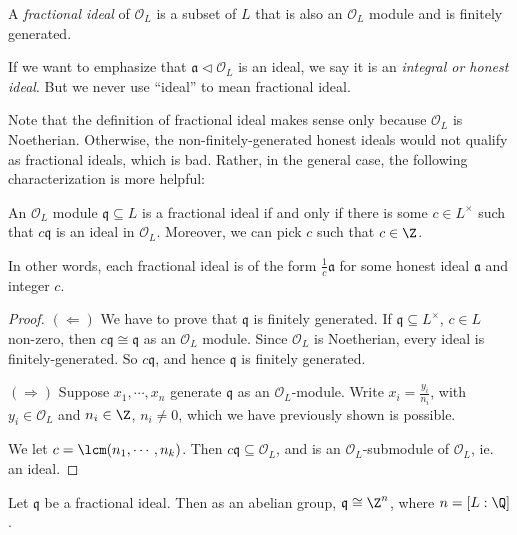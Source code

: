 \documentclass[a4paper]{article}
\begin{document}
\begin{defi}
  A \emph{fractional ideal} of $\mathcal{O}_L$ is a subset of $L$ that is also an $\mathcal{O}_L$ module and is finitely generated.
\end{defi}

\begin{defi}
  If we want to emphasize that $\mathfrak{a} \lhd \mathcal{O}_L$ is an ideal, we say it is an \emph{integral or honest ideal}. But we never use ``ideal'' to mean fractional ideal.
\end{defi}

Note that the definition of fractional ideal makes sense only because $\mathcal{O}_L$ is Noetherian. Otherwise, the non-finitely-generated honest ideals would not qualify as fractional ideals, which is bad. Rather, in the general case, the following characterization is more helpful:

\begin{lemma}
  An $\mathcal{O}_L$ module $\mathfrak{q} \subseteq L$ is a fractional ideal if and only if there is some $c \in L^\times$ such that $c\mathfrak{q}$ is an ideal in $\mathcal{O}_L$. Moreover, we can pick $c$ such that $c \in \Z$.
\end{lemma}
In other words, each fractional ideal is of the form $\frac{1}{c} \mathfrak{a}$ for some honest ideal $\mathfrak{a}$ and integer $c$.
\begin{proof}
  $(\Leftarrow)$ We have to prove that $\mathfrak{q}$ is finitely generated. If $\mathfrak{q} \subseteq L^\times$, $c \in L$ non-zero, then $c\mathfrak{q} \cong \mathfrak{q}$ as an $\mathcal{O}_L$ module. Since $\mathcal{O}_L$ is Noetherian, every ideal is finitely-generated. So $c\mathfrak{q}$, and hence $\mathfrak{q}$ is finitely generated.

  $(\Rightarrow)$ Suppose $x_1, \cdots, x_n$ generate $\mathfrak{q}$ as an $\mathcal{O}_L$-module. Write $x_i = \frac{y_i}{n_i}$, with $y_i \in \mathcal{O}_L$ and $n_i \in \Z$, $n_i \not= 0$, which we have previously shown is possible.

  We let $c = \lcm(n_1, \cdots, n_k)$. Then $c\mathfrak{q} \subseteq \mathcal{O}_L$, and is an $\mathcal{O}_L$-submodule of $\mathcal{O}_L$, ie. an ideal.
\end{proof}

\begin{cor}
  Let $\mathfrak{q}$ be a fractional ideal. Then as an abelian group, $\mathfrak{q} \cong \Z^n$, where $n = [L:\Q]$.
\end{cor}
\end{document}
